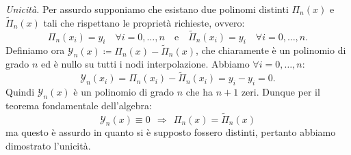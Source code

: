 \textit{Unicità.} Per assurdo supponiamo che esistano due polinomi distinti $\Pi _{n}(x)$ e $\tilde{\Pi }_{n}(x)$ tali che rispettano le proprietà richieste, ovvero:
\begin{equation*}
\Pi _{n}( x_{i}) =y_{i} \quad \forall i=0,\dotsc ,n \quad \text{e} \quad \tilde{\Pi }_{n}( x_{i}) =y_{i} \quad \forall i=0,\dotsc ,n.
\end{equation*}
Definiamo ora $\mathcal{Y}_{n}(x) \coloneqq \Pi _{n}(x) -\tilde{\Pi }_{n}(x)$, che chiaramente è un polinomio di grado $n$ ed è nullo su tutti i nodi interpolazione. Abbiamo $\forall i=0,\dotsc ,n$:
$$
	\mathcal{Y}_{n}( x_{i})
	=\Pi _{n}( x_{i}) -\tilde{\Pi }_{n}( x_{i})
	=y_{i} -y_{i}
	=0.
$$
Quindi $\mathcal{Y}_{n}(x)$ è un polinomio di grado $n$ che ha $n+1$ zeri. Dunque per il teorema fondamentale dell'algebra:
\begin{equation*}
\mathcal{Y}_{n}(x) \equiv 0\ \ \Rightarrow \ \ \Pi _{n}(x) =\tilde{\Pi }_{n}(x)
\end{equation*}
ma questo è assurdo in quanto si è supposto fossero distinti, pertanto abbiamo dimostrato l'unicità. \textqed

